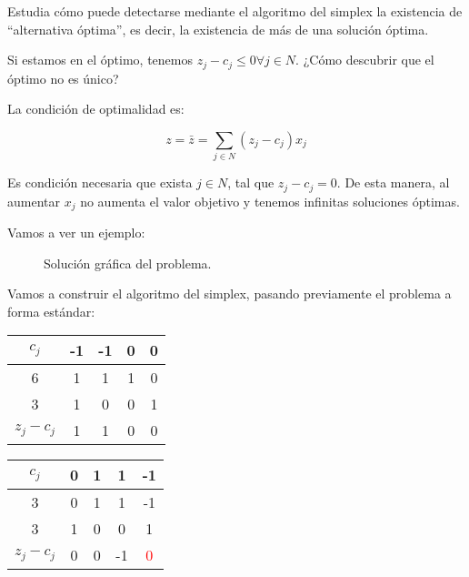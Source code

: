 \begin{problem}

Estudia cómo puede detectarse mediante el algoritmo del simplex la existencia de “alternativa óptima”, es decir, la existencia de más de una solución óptima.
\solution

Si estamos en el óptimo, tenemos $z_j - c_j ≤ 0 ∀j∈N$. ¿Cómo descubrir que el óptimo no es único?

La condición de optimalidad es:

\[z = \bar{z} = \sum_{j∈N}(z_j - c_j)x_j\]

Es condición necesaria que exista $j∈N$, tal que $z_j - c_j = 0$.
%
De esta manera, al aumentar $x_j$ no aumenta el valor objetivo y tenemos infinitas soluciones óptimas.

Vamos a ver un ejemplo:

\begin{ioprob}
\end{ioprob}

\begin{figure}[hbtp]
\centering
{}
\caption{Solución gráfica del problema.}
\end{figure}



Vamos a construir el algoritmo del simplex, pasando previamente el problema a forma estándar:

\begin{table}[hbtp]
\centering
\begin{tabular}{c|cccc}
$c_j$ & -1 & -1 &0&0\\\hline\hline
6&1&1&1&0\\
3&1&0&0&1\\\hline
$z_j - c_j$ & 1&1&0&0
\end{tabular}
\end{table}


\begin{table}[hbtp]
\centering
\begin{tabular}{c|cccc}
$c_j$ & 0 & 1 & 1 & -1\\\hline\hline
3 & 0 & 1 & 1 & -1 \\
3 & 1 & 0 & 0 & 1 \\\hline
$z_j - c_j$ & 0&0&-1& \textcolor{red}{0}
\end{tabular}
\end{table}



\end{problem}
